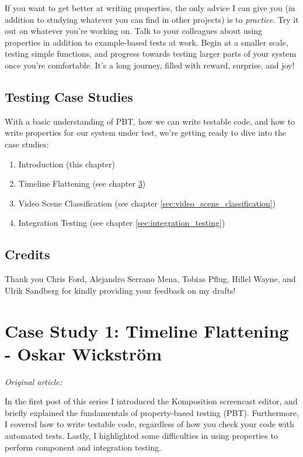If you want to get better at writing properties, the only advice I can give you (in addition to studying whatever you can find in other projects) is to \textit{practice}. Try it out on whatever you're working on. Talk to your colleagues about using properties in addition to example-based tests at work. Begin at a smaller scale, testing simple functions, and progress towards testing larger parts of your system once you're comfortable. It's a long journey, filled with reward, surprise, and joy!

\section{Testing Case Studies}


With a basic understanding of PBT, how we can write testable code, and how to write properties for our system under test, we're getting ready to dive into the case studies:

\begin{enumerate}
\item Introduction (this chapter)
\item Timeline Flattening (see chapter \ref{sec:timeline_flattening})
\item Video Scene Classification (see chapter \ref{sec:video_scene_classification})
\item Integration Testing (see chapter \ref{sec:integration_testing})
\end{enumerate}


\section{Credits}

Thank you Chris Ford, Alejandro Serrano Mena, Tobias Pflug, Hillel Wayne, and Ulrik Sandberg for kindly providing your feedback on my drafts!


\chapter{Case Study 1: Timeline Flattening - Oskar Wickstr\"om}
\label{sec:timeline_flattening}

\vspace{\baselineskip}
\noindent\textit{Original article: \cite{timeline_flattening}}
\vspace{\baselineskip}

\noindent In the first post of this series I introduced the Komposition screencast editor, and briefly explained the fundamentals of property-based testing (PBT). Furthermore, I covered how to write testable code, regardless of how you check your code with automated tests. Lastly, I highlighted some difficulties in using properties to perform component and integration testing.

